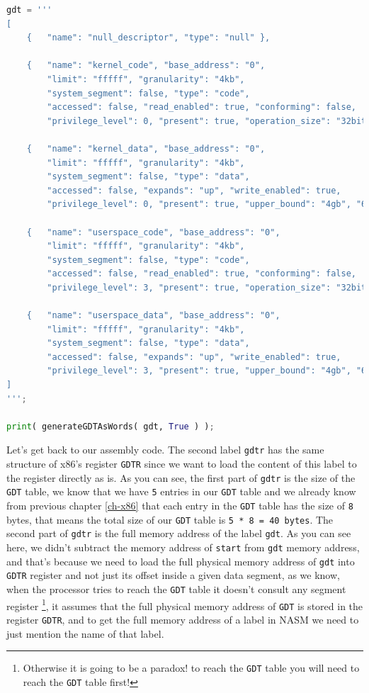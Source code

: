 \begin{lstlisting}[language=Python]
gdt = '''
[
    {   "name": "null_descriptor", "type": "null" },
    
    {   "name": "kernel_code", "base_address": "0", 
        "limit": "fffff", "granularity": "4kb", 
        "system_segment": false, "type": "code", 
        "accessed": false, "read_enabled": true, "conforming": false,
        "privilege_level": 0, "present": true, "operation_size": "32bit", "64bit": false  },
        
    {   "name": "kernel_data", "base_address": "0", 
        "limit": "fffff", "granularity": "4kb", 
        "system_segment": false, "type": "data", 
        "accessed": false, "expands": "up", "write_enabled": true,
        "privilege_level": 0, "present": true, "upper_bound": "4gb", "64bit": false  },
        
    {   "name": "userspace_code", "base_address": "0", 
        "limit": "fffff", "granularity": "4kb", 
        "system_segment": false, "type": "code", 
        "accessed": false, "read_enabled": true, "conforming": false,
        "privilege_level": 3, "present": true, "operation_size": "32bit", "64bit": false  },
        
    {   "name": "userspace_data", "base_address": "0", 
        "limit": "fffff", "granularity": "4kb", 
        "system_segment": false, "type": "data", 
        "accessed": false, "expands": "up", "write_enabled": true,
        "privilege_level": 3, "present": true, "upper_bound": "4gb", "64bit": false  }
]
''';

print( generateGDTAsWords( gdt, True ) );
\end{lstlisting}

Let's get back to our assembly code. The second label \lstinline!gdtr!
has the same structure of x86's register \lstinline!GDTR! since we want
to load the content of this label to the register directly as is. As you
can see, the first part of \lstinline!gdtr! is the size of the
\lstinline!GDT! table, we know that we have \lstinline!5! entries in our
\lstinline!GDT! table and we already know from previous chapter
\ref{ch-x86} that each entry in the \lstinline!GDT! table has the size
of \lstinline!8! bytes, that means the total size of our \lstinline!GDT!
table is \lstinline!5 * 8 = 40 bytes!. The second part of
\lstinline!gdtr! is the full memory address of the label
\lstinline!gdt!. As you can see here, we didn't subtract the memory
address of \lstinline!start! from \lstinline!gdt! memory address, and
that's because we need to load the full physical memory address of
\lstinline!gdt! into \lstinline!GDTR! register and not just its offset
inside a given data segment, as we know, when the processor tries to
reach the \lstinline!GDT! table it doesn't consult any segment register
\footnote{Otherwise it is going to be a paradox! to reach the
  \lstinline!GDT! table you will need to reach the \lstinline!GDT! table
  first!}, it assumes that the full physical memory address of
\lstinline!GDT! is stored in the register \lstinline!GDTR!, and to get
the full memory address of a label in NASM we need to just mention the
name of that label.

